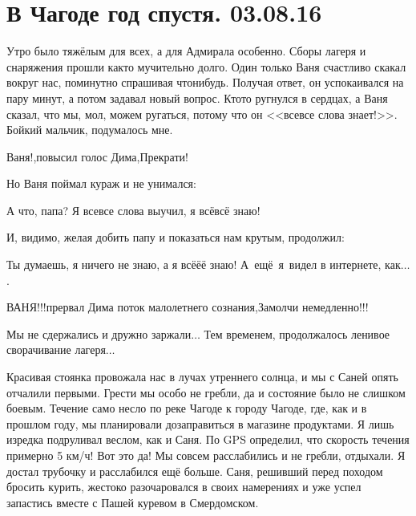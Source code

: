\chapter{В Чагоде год спустя. 03.08.16} 

Утро было тяжёлым для всех, а для Адмирала особенно. Сборы лагеря и снаряжения прошли как\sdash то мучительно долго. Один только Ваня счастливо скакал вокруг нас, поминутно спрашивая что\sdash нибудь. Получая ответ, он успокаивался на пару минут, а потом задавал новый вопрос. Кто\sdash то ругнулся в сердцах, а Ваня сказал, что мы, мол, можем ругаться, потому что он <<все\sdash все слова знает!>>. Бойкий мальчик, подумалось мне. 


\diagdash Ваня!,\mdash повысил голос Дима,\mdash Прекрати! 

Но Ваня поймал кураж и не унимался: 

\diagdash А что, папа? Я все\sdash все слова выучил, я всё\sdash всё знаю! 

И, видимо, желая добить папу и показаться нам крутым, продолжил: 

\diagdash Ты думаешь, я ничего не знаю, а я всё\sdash ё\sdash ё знаю! А~ещё~я~видел в интернете, как$\ldots$. 

\diagdash ВАНЯ!!!\mdash прервал Дима поток малолетнего сознания,\mdash Замолчи немедленно!!! 

Мы не сдержались и  дружно заржали$\ldots$ Тем временем, продолжалось ленивое сворачивание лагеря$\ldots$ 

Красивая стоянка провожала нас в лучах утреннего солнца, и мы с Саней опять отчалили первыми. Грести мы особо не гребли, да и состояние было не слишком боевым. Течение само несло по реке Чагоде к городу Чагоде, где, как и в прошлом году, мы планировали дозаправиться в магазине продуктами. Я лишь изредка подруливал веслом, как и Саня. По GPS определил, что скорость течения примерно 5 км/ч! Вот это да! Мы совсем расслабились и не гребли, отдыхали. Я достал трубочку и расслабился ещё больше. Саня, решивший перед походом бросить курить, жестоко разочаровался в своих намерениях и уже успел запастись вместе с Пашей куревом в Смердомском.


